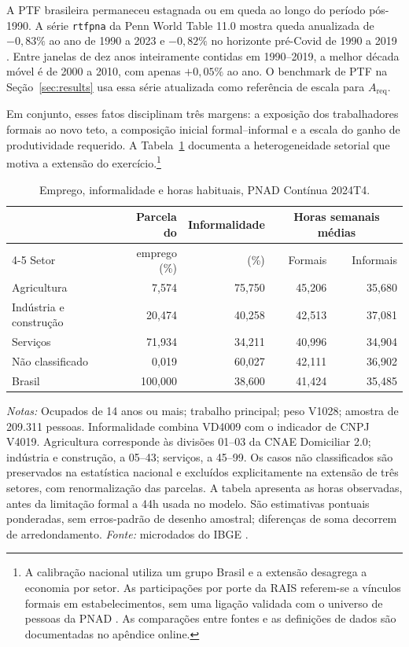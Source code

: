 A PTF brasileira permaneceu estagnada ou em queda ao longo do período pós-1990. A série \texttt{rtfpna} da Penn World Table 11.0 mostra queda anualizada de $-0{,}83\%$ ao ano de 1990 a 2023 e $-0{,}82\%$ no horizonte pré-Covid de 1990 a 2019 \citep{FeenstraInklaarTimmer2015,PWT2025,FREDPWTBrazil2026}. Entre janelas de dez anos inteiramente contidas em 1990--2019, a melhor década móvel é de 2000 a 2010, com apenas $+0{,}05\%$ ao ano. O benchmark de PTF na Seção~\ref{sec:results} usa essa série atualizada como referência de escala para $A_{\text{req}}$.

Em conjunto, esses fatos disciplinam três margens: a exposição dos trabalhadores formais ao novo teto, a composição inicial formal--informal e a escala do ganho de produtividade requerido. A Tabela~\ref{tab:facts_informality} documenta a heterogeneidade setorial que motiva a extensão do exercício.\footnote{A calibração nacional utiliza um grupo Brasil e a extensão desagrega a economia por setor. As participações por porte da RAIS referem-se a vínculos formais em estabelecimentos, sem uma ligação validada com o universo de pessoas da PNAD \citep{RAIS2022TabelasVerificadas}. As comparações entre fontes e as definições de dados são documentadas no apêndice online.}

\begin{table}[t]
\centering
\caption{Emprego, informalidade e horas habituais, PNAD Contínua 2024T4.}\label{tab:facts_informality}
\normalsize
\begin{tabular}{lrrrr}
\toprule
 & Parcela do & Informalidade & \multicolumn{2}{c}{Horas semanais médias} \\
\cmidrule(lr){4-5}
Setor & emprego (\%) & (\%) & Formais & Informais \\
\midrule
Agricultura & 7{,}574 & 75{,}750 & 45{,}206 & 35{,}680 \\
Indústria e construção & 20{,}474 & 40{,}258 & 42{,}513 & 37{,}081 \\
Serviços & 71{,}934 & 34{,}211 & 40{,}996 & 34{,}904 \\
Não classificado & 0{,}019 & 60{,}027 & 42{,}111 & 36{,}902 \\
\midrule
Brasil & 100{,}000 & 38{,}600 & 41{,}424 & 35{,}485 \\
\bottomrule
\end{tabular}
\begin{minipage}{0.96\textwidth}
\normalsize\justifying
\textit{Notas:} Ocupados de 14 anos ou mais; trabalho principal; peso V1028; amostra de 209.311 pessoas. Informalidade combina VD4009 com o indicador de CNPJ V4019. Agricultura corresponde às divisões 01--03 da CNAE Domiciliar 2.0; indústria e construção, a 05--43; serviços, a 45--99. Os casos não classificados são preservados na estatística nacional e excluídos explicitamente na extensão de três setores, com renormalização das parcelas. A tabela apresenta as horas observadas, antes da limitação formal a 44h usada no modelo. São estimativas pontuais ponderadas, sem erros-padrão de desenho amostral; diferenças de soma decorrem de arredondamento. \textit{Fonte:} microdados do IBGE \citep{PNAD2024T4Microdados}.
\end{minipage}
\end{table}
